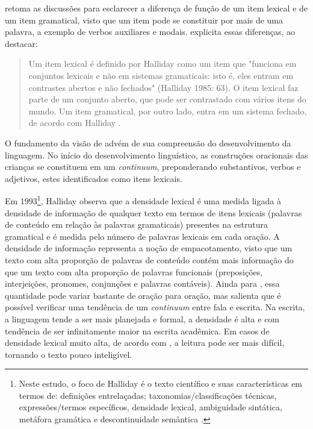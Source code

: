 \documentclass[portuguese]{textolivre}
\begin{document}
\textcite{halliday_spoken_1985} retoma as discussões para esclarecer a diferença de função de um item lexical e de um item gramatical, visto que um item pode se constituir por mais de uma palavra, a exemplo de verbos auxiliares e modais. \textcite{johansson_lexical_2008} explicita essas diferenças, ao destacar:

\begin{quote}
    Um item lexical é definido por Halliday como um item que "funciona em conjuntos lexicais e não em sistemas gramaticais: isto é, eles entram em contrastes abertos e não fechados" (Halliday 1985: 63). O item lexical faz parte de um conjunto aberto, que pode ser contrastado com vários itens do mundo. Um item gramatical, por outro lado, entra em um sistema fechado, de acordo com Halliday \cite[p. 66]{johansson_lexical_2008}.
\end{quote}

O fundamento da visão de \textcite{halliday_spoken_1985} advém de sua compreensão do desenvolvimento da linguagem. No início do desenvolvimento linguístico, as construções oracionais das crianças se constituem em um \textit{continuum}, preponderando substantivos, verbos e adjetivos, estes identificados como itens lexicais.

Em 1993\footnote{Neste estudo, o foco de Halliday é o texto científico e suas características em termos de: definições entrelaçadas; taxonomias/classificações técnicas, expressões/termos específicos, densidade lexical, ambiguidade sintática, metáfora gramática e descontinuidade semântica \cite[p. 78]{halliday_grammatical_1993}.}, Halliday observa que a densidade lexical é uma medida ligada à densidade de informação de qualquer texto em termos de itens lexicais (palavras de conteúdo em relação às palavras gramaticais) presentes na estrutura gramatical e é medida pelo número de palavras lexicais em cada oração. A densidade de informação representa a noção de empacotamento, visto que um texto com alta proporção de palavras de conteúdo contém mais informação do que um texto com alta proporção de palavras funcionais (preposições, interjeições, pronomes, conjunções e palavras contáveis). Ainda para \textcite{halliday_grammatical_1993}, essa quantidade pode variar bastante de oração para oração, mas salienta que é possível verificar uma tendência de um \textit{continuum} entre fala e escrita. Na escrita, a linguagem tende a ser mais planejada e formal, a densidade é alta e com tendência de ser infinitamente maior na escrita acadêmica. Em casos de densidade lexical muito alta, de acordo com \textcite{halliday_grammatical_1993}, a leitura pode ser mais difícil, tornando o texto pouco inteligível. 
\end{document}
